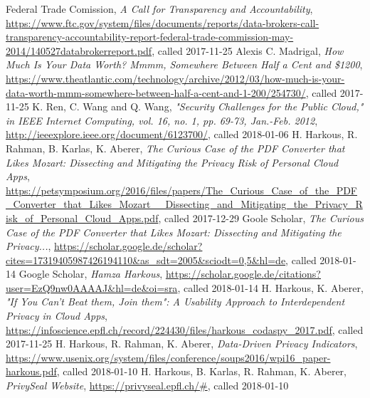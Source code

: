 \documentclass[11pt,twocolumn,a4paper,DIV=calc]{scrartcl}
\begin{document}
\begin{thebibliography}{99}
  Federal Trade Comission, \emph{A Call for Transparency and Accountability}, \url{https://www.ftc.gov/system/files/documents/reports/data-brokers-call-transparency-accountability-report-federal-trade-commission-may-2014/140527databrokerreport.pdf}, called 2017-11-25
  Alexis C. Madrigal, \emph{How Much Is Your Data Worth? Mmmm, Somewhere Between Half a Cent and \$1200}, \url{https://www.theatlantic.com/technology/archive/2012/03/how-much-is-your-data-worth-mmm-somewhere-between-half-a-cent-and-1-200/254730/}, called 2017-11-25
  K. Ren, C. Wang and Q. Wang, \emph{"Security Challenges for the Public Cloud," in IEEE Internet Computing, vol. 16, no. 1, pp. 69-73, Jan.-Feb. 2012}, \url{http://ieeexplore.ieee.org/document/6123700/}, called 2018-01-06
  H. Harkous, R. Rahman, B. Karlas, K. Aberer, \emph{The Curious Case of the PDF Converter that Likes Mozart: Dissecting and Mitigating the Privacy Risk of Personal Cloud Apps}, \url{https://petsymposium.org/2016/files/papers/The\_Curious\_Case\_of\_the\_PDF\_Converter\_that\_Likes\_Mozart\_\_Dissecting\_and\_Mitigating\_the\_Privacy\_Risk\_of\_Personal\_Cloud\_Apps.pdf}, called 2017-12-29
Goole Scholar, \emph{The Curious Case of the PDF Converter that Likes Mozart: Dissecting and Mitigating the Privacy...}, \url{https://scholar.google.de/scholar?cites=17319405987426194110&as_sdt=2005&sciodt=0,5&hl=de}, called 2018-01-14
Google Scholar, \emph{Hamza Harkous}, \url{https://scholar.google.de/citations?user=EzQ9nw0AAAAJ&hl=de&oi=sra}, called 2018-01-14
  H. Harkous, K. Aberer, \emph{"If You Can't Beat them, Join them": A Usability Approach to Interdependent Privacy in Cloud Apps}, \url{https://infoscience.epfl.ch/record/224430/files/harkous\_codaspy\_2017.pdf}, called 2017-11-25
  H. Harkous, R. Rahman, K. Aberer, \emph{Data-Driven Privacy Indicators}, \url{https://www.usenix.org/system/files/conference/soups2016/wpi16\_paper-harkous.pdf}, called 2018-01-10
  H. Harkous, B. Karlas, R. Rahman, K. Aberer, \emph{PrivySeal Website}, \url{https://privyseal.epfl.ch/#}, called 2018-01-10
\end{thebibliography}
\end{document}
